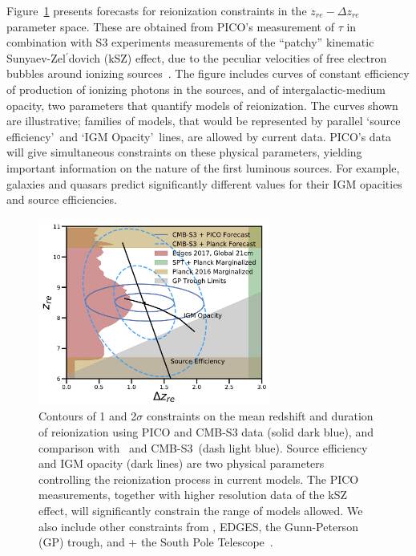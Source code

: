 \documentclass[PICOReport.tex]{subfiles}
\begin{document}
Figure~\ref{fig:ReionizationPICO} presents forecasts for reionization constraints in the $z_{re} - \Delta z_{re}$ parameter space. These are obtained from PICO's measurement of $\tau$ in combination with S3 experiments measurements of the ``patchy'' kinematic Sunyaev-Zel$^{\prime}$dovich (kSZ) effect, due to the peculiar velocities of free electron bubbles around ionizing sources~\citep{Calabrese2014}.
The figure includes curves of constant efficiency of production of ionizing photons in the sources, and of intergalactic-medium opacity, two parameters that quantify models of reionization. The curves shown are illustrative; families of models, that would be represented by parallel \lq source efficiency\rq~and \lq IGM Opacity\rq~lines, are allowed by current data. PICO's data will give simultaneous constraints on these physical parameters, yielding important information on the nature of the first luminous sources. For example, galaxies and quasars predict significantly different values for their IGM opacities and source efficiencies.  

\begin{figure}
\hspace{-0.2in}
\parbox{3.1in}{\centerline {
\includegraphics[width=3.0in]{images/Reionization_Contours_zbar_delz_PICO_NEW.pdf} } }
\hspace{0.in}
\parbox{3.5in}{
\caption{\captiontext 
Contours of 1 and 2$\sigma$ constraints on the mean redshift and duration of reionization using PICO and CMB-S3 data (solid dark blue), and comparison with \planck\ and CMB-S3~(dash light blue). Source efficiency and IGM opacity (dark lines) are two physical parameters controlling the reionization process in current models. The PICO measurements, together with higher resolution data of the kSZ effect, will significantly constrain the range of models allowed. We also include other constraints from \planck , EDGES, the Gunn-Peterson (GP) trough, and \planck + the South Pole Telescope~\citep{Planck2018_VI,EDGES2017,Fan2006,Planck2016_reion}.  
\label{fig:ReionizationPICO}
} }
\vspace{-0.1in}
\end{figure}
\end{document}
